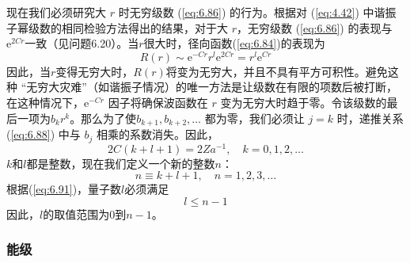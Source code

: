     现在我们必须研究大 $r$ 时无穷级数 (\ref{eq:6.86}) 的行为。根据对 (\ref{eq:4.42}) 中谐振子幂级数的相同检验方法得出的结果，对于大 $r$，无穷级数 (\ref{eq:6.86}) 的表现与$\mathrm{e}^{2Cr}$一致（见问题6.20）。当$r$很大时，径向函数(\ref{eq:6.84})的表现为
    \begin{equation}
        R\left(r\right) \sim \mathrm{e}^{-Cr}r^l\mathrm{e}^{2Cr} = r^l\mathrm{e}^{Cr}
        \label{eq:6.89}
    \end{equation}
    因此，当$r$变得无穷大时，$R\left(r\right)$将变为无穷大，并且不具有平方可积性。避免这种 “无穷大灾难”（如谐振子情况）的唯一方法是让级数在有限的项数后被打断，在这种情况下，$\mathrm{e}^{-Cr}$ 因子将确保波函数在 $r$ 变为无穷大时趋于零。令该级数的最后一项为$b_kr^k$。那么为了使$b_{k+1}, b_{k+2}, \ldots$ 都为零，我们必须让 $j=k$ 时，递推关系 (\ref{eq:6.88}) 中与 $b_j$ 相乘的系数消失。因此，
    \begin{equation}
        2C\left(k+l+1\right) = 2Za^{-1}, \quad k = 0, 1, 2, \ldots
        \label{eq:6.90}
    \end{equation}
    $k$和$l$都是整数，现在我们定义一个新的整数$n$：
    \begin{equation}
        n \equiv k + l + 1, \quad n = 1, 2, 3, \ldots
        \label{eq:6.91}
    \end{equation}
    根据(\ref{eq:6.91})，量子数$l$必须满足
    \begin{equation}
        l \leq n-1
        \label{eq:6.92}
    \end{equation}
    因此，$l$的取值范围为0到$n-1$。
    \\

\subsubsection*{能级}

